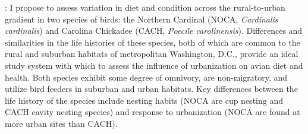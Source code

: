 \documentclass[12pt]{article}
\begin{document}

: I propose to assess variation in diet and condition across the rural-to-urban gradient in two species of birds: the Northern Cardinal (NOCA, \textit{Cardinalis cardinalis}) and Carolina Chickadee (CACH, \textit{Poecile carolinensis}). Differences and similarities in the life histories of these species, both of which are common to the rural and suburban habitats of metropolitan Washington, D.C., provide an ideal study system with which to assess the influence of urbanization on avian diet and health. Both species exhibit some degree of omnivory, are non-migratory, and utilize bird feeders in suburban and urban habitats. Key differences between the life history of the species include nesting habits (NOCA are cup nesting and CACH cavity nesting species) and response to urbanization (NOCA are found at more urban sites than CACH). %
\end{document}
